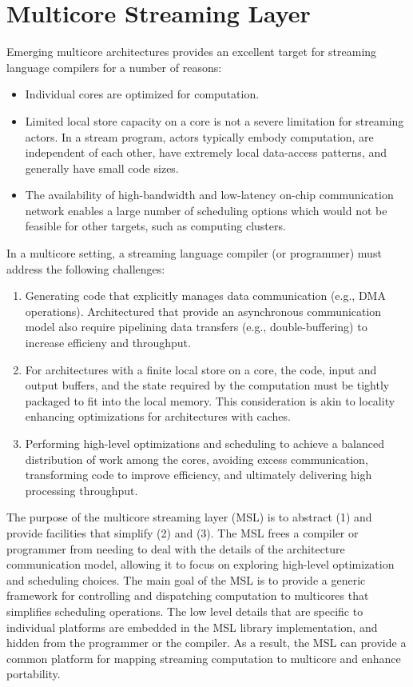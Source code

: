 \section{Multicore Streaming Layer}\label{ch:lib}

Emerging multicore architectures provides an excellent target for
streaming language compilers for a number of reasons:
\begin{itemize}
\item Individual cores are optimized for computation.
\item Limited local store capacity on a core is not a severe
limitation for streaming actors. In a stream program, actors typically
embody computation, are independent of each other, have extremely
local data-access patterns, and generally have small code sizes.
\item The availability of high-bandwidth and low-latency on-chip
communication network enables a large number of scheduling options
which would not be feasible for other targets, such as computing
clusters.
\end{itemize}

In a multicore setting, a streaming language compiler (or programmer)
must address the following challenges:
\begin{enumerate}
\item Generating code that explicitly manages data communication
  (e.g., DMA operations). Architectured that provide an asynchronous
  communication model also require pipelining data transfers (e.g.,
  double-buffering) to increase efficieny and throughput.
\item For architectures with a finite local store on a core, the code,
  input and output buffers, and the state required by the computation
  must be tightly packaged to fit into the local memory. This
  consideration is akin to locality enhancing optimizations for
  architectures with caches.
\item Performing high-level optimizations and scheduling to achieve a
  balanced distribution of work among the cores, avoiding excess
  communication, transforming code to improve efficiency, and
  ultimately delivering high processing throughput.
\end{enumerate}

The purpose of the multicore streaming layer (MSL) is to abstract
\textsf{(1)} and provide facilities that simplify \textsf{(2)} and
\textsf{(3)}. The MSL frees a compiler or programmer from needing to
deal with the details of the architecture communication model,
allowing it to focus on exploring high-level optimization and
scheduling choices. The main goal of the MSL is to provide a generic
framework for controlling and dispatching computation to multicores
that simplifies scheduling operations. The low level details that are
specific to individual platforms are embedded in the MSL library
implementation, and hidden from the programmer or the compiler. As a
result, the MSL can provide a common platform for mapping streaming
computation to multicore and enhance portability.
